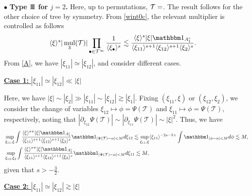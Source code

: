 \documentclass[a4paper,
11pt,  reqno]{amsart}
\makeatletter
\newcommand{\III}{\textup{I \hspace{-2.9mm} I \hspace{-2.9mm} I}}
\newcommand{\5}{\textup{V}}
\newcommand{\noi}{\noindent}
\newcommand{\ind}{\mathbbm 1}
\newcommand{\les}{\lesssim}
\theoremstyle{remark}
\newcommand{\bul}{\bullet}
\newcommand{\TT}{\mathcal{T}}
\newcommand{\al}{\alpha}
\newcommand{\ges}{\gtrsim}
\newcommand{\jb}[1]
{\langle #1 \rangle}
\DeclareMathOperator{\mul}{mul}
\def\<#1>{\csname MH@symb@#1\endcsname}
\numberwithin{equation}{section}
\numberwithin{theorem}{section}
\makeatother
\begin{document}
\smallskip 

\noi
$\bul$ \textbf{Type $\III$ for $j=2$.}
Here, up to permutations, $\TT=\<21>$. The result follows for the other choice of tree by symmetry. 
From \eqref{wint0c}, the relevant multiplier is controlled as follows
\begin{align}
    \jb{\xi}^s | \mul_3 (\TT)| 
    \prod_{\bul \in \TT^\infty} \frac{1}{\jb{\xi_\bul}^s}
    &
    \les 
    \frac{\jb{\xi}^{s} |\xi|  \ind_{A_1^c} }{ \jb{\xi_{11}}^{s+1} \jb{\xi_{12}}^{s+1} \jb{\xi_{2}}^s}
    .
\end{align}
 From \eqref{A}, we have $|\xi_{11}| \simeq |\xi_{12}|$, and consider different cases.


\smallskip
\noi
\underline{\textbf{Case 1:} $|\xi_{11}| \simeq |\xi_{12}| \ll |\xi|$}

Here, we have $|\xi| \sim |\xi_2| \gg |\xi_{11}| \sim |\xi_{12}| \ges |\xi_1|$.
Fixing $(\xi_{11},\xi)$ or $(\xi_{12}, \xi_2)$, we consider the change of variables $\xi_{12} \mapsto \phi = \Psi(\TT)$ and $\xi_{11} \mapsto \phi = \Psi(\TT)$, respectively, noting that $|\partial_{\xi_{12}} \Psi(\TT)| \sim |\partial_{\xi_{11}} \Psi(\TT)| \sim |\xi|^2 $. Thus, we have
\begin{align}
&
    \sup_{\xi_{11}, \xi} 
    \int 
    \frac{\jb{\xi}^{s+} |\xi|  \ind_{A_1^c} }{ \jb{\xi_{11}}^{s+1} \jb{\xi_{12}}^{s+1} \jb{\xi_{2}}^s}
    \ind_{|\Psi(\TT)- \al | < M } d\xi_{12}
    \les 
    \sup_{\xi_{11},\xi} \jb{\xi_{11}}^{-2s -3 +} \int \ind_{|\phi-\al|<M} d\phi \les M 
    , 
    \\
    &
    \sup_{\xi_{12}, \xi_2} 
    \int 
    \frac{\jb{\xi}^{s+} |\xi|  \ind_{A_1^c} }{ \jb{\xi_{11}}^{s+1} \jb{\xi_{12}}^{s+1} \jb{\xi_{2}}^s}
    \ind_{|\Psi(\TT)- \al | < M } d\xi_{11}
    \les M , 
\end{align}
given that $s>-\frac32$. 


\smallskip
\noi
\underline{\textbf{Case 2:} $|\xi_{11}| \simeq |\xi_{12}| \ges |\xi|$}
\end{document}
